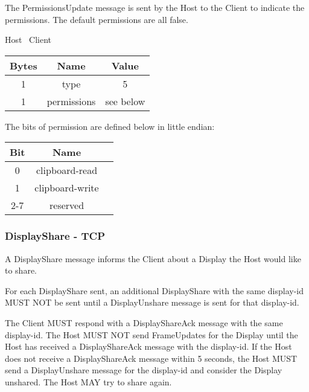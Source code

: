 The PermissionsUpdate message is sent by the Host to the Client to indicate the permissions.
The default permissions are all false.

\begin{center}
    Host \textrightarrow\ Client\\
    \begin{tabular}{|c|c|c|}
        \hline
        \textbf{Bytes} & \textbf{Name} & \textbf{Value} \\
        \hline
        1              & type          & 5              \\
        \hline
        1              & permissions   & see below      \\
        \hline
    \end{tabular}
\end{center}

The bits of permission are defined below in little endian:

\begin{center}
    \begin{tabular}{|c|c|c|}
        \hline
        \textbf{Bit} & \textbf{Name}   \\
        \hline
        0            & clipboard-read  \\
        \hline
        1            & clipboard-write \\
        \hline
        2-7          & reserved        \\
        \hline
    \end{tabular}
\end{center}

\subsubsection{DisplayShare - TCP}
A DisplayShare message informs the Client about a Display the Host would like to share.

For each DisplayShare sent, an additional DisplayShare with the same display-id MUST NOT be sent until a
DisplayUnshare message is sent for that display-id.

The Client MUST respond with a DisplayShareAck message with the same display-id.
The Host MUST NOT send FrameUpdates for the Display until the Host has received a DisplayShareAck message with the display-id.
If the Host does not receive a DisplayShareAck message within 5 seconds, the Host MUST send a DisplayUnshare message
for the display-id and consider the Display unshared.
The Host MAY try to share again.


